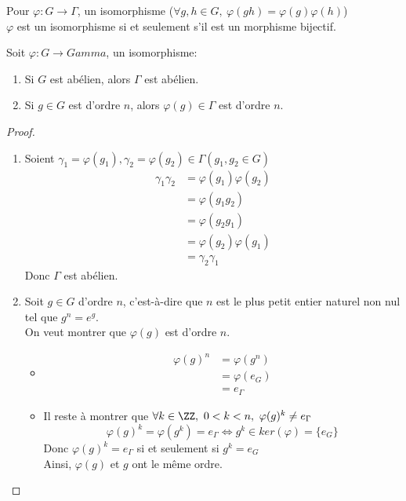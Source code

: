 \documentclass[../main.tex]{subfile}
\begin{document}
\begin{rap}
	Pour $\varphi : G \to \Gamma$, un isomorphisme 
	($\forall g, h \in G, \ \varphi(gh) = \varphi(g) \varphi(h)$)\\
	$\varphi$ est un isomorphisme si et seulement s'il est un morphisme bijectif.
\end{rap}

\begin{prop}
	Soit $\varphi : G \to Gamma$, un isomorphisme:\\
\begin{enumerate}	
	\item Si $G$ est abélien, alors $\Gamma$ est abélien.
	\item Si $g \in G$ est d'ordre $n$, alors $\varphi(g) \in \Gamma$ est d'ordre $n$.
\end{enumerate}
\end{prop}

\begin{proof}
\begin{enumerate}	
	\item Soient $\gamma_1 = \varphi(g_1), \gamma_2 = \varphi(g_2) \in \Gamma(g_1, g_2 \in G)$
	$$
\begin{aligned}
	\gamma_1\gamma_2 &= \varphi(g_1)\varphi(g_2)\\
	&= \varphi(g_1g_2)\\
	&= \varphi(g_2g_1)\\
	&= \varphi(g_2)\varphi(g_1)\\
	&= \gamma_2\gamma_1
\end{aligned}
	$$
	Donc $\Gamma$ est abélien.

	\item Soit $g \in G$ d'ordre $n$, c'est-à-dire que $n$ est le plus petit entier naturel
	non nul tel que $g^n = e^g$.\\
	On veut montrer que $\varphi(g)$ est d'ordre $n$. 
\begin{itemize}	
	\item 
	$$
\begin{aligned}
	\varphi(g)^n &= \varphi(g^n)\\
	&= \varphi(e_G)\\
	&= e_\Gamma
\end{aligned}
	$$
	\item Il reste à montrer que $\forall k \in \ZZ, \ 0<k<n, \ \varphi(g)^k \neq e_\Gamma$\\
	$$\varphi(g)^k = \varphi(g^k) = e_\Gamma \Leftrightarrow g^k \in ker(\varphi) = \{e_G\}$$
	Donc $\varphi(g)^k = e_\Gamma$ si et seulement si $g^k = e_G$\\
	Ainsi, $\varphi(g)$ et $g$ ont le même ordre.
\end{itemize}
\end{enumerate}
\end{proof}
\end{document}
